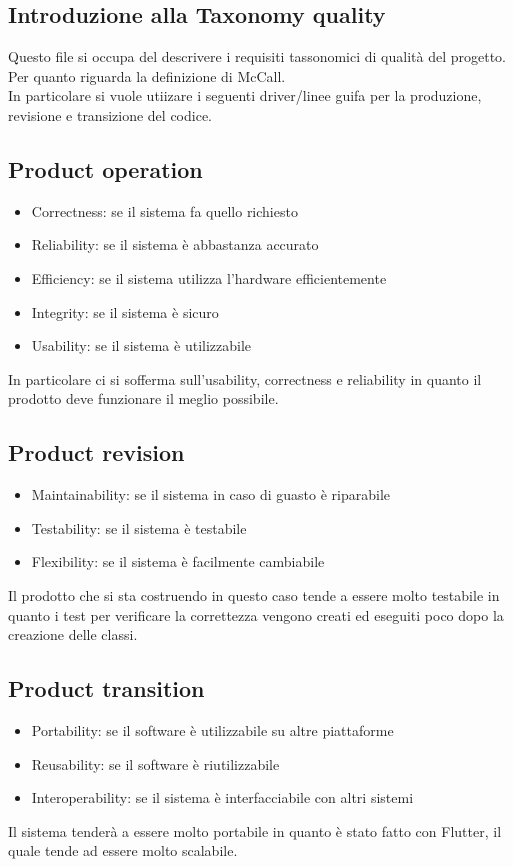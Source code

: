 \documentclass{article}
\begin{document}
\subsection{Introduzione alla Taxonomy quality}
Questo file si occupa del descrivere i requisiti tassonomici di qualità del progetto.
\\Per quanto riguarda la definizione di McCall.
\\In particolare si vuole utiizare i seguenti driver/linee guifa per la produzione, revisione e
transizione  del codice.     
\subsection{Product operation}
\begin{itemize}
    \item Correctness: se il sistema fa quello richiesto
    \item Reliability: se il sistema è abbastanza accurato
    \item Efficiency: se il sistema utilizza l'hardware efficientemente
    \item Integrity: se il sistema è sicuro
    \item Usability: se il sistema è utilizzabile
\end{itemize}
In particolare ci si sofferma sull'usability, correctness e reliability in quanto il 
prodotto deve funzionare il meglio possibile.

\subsection{Product revision}
\begin{itemize}
    \item Maintainability: se il sistema in caso di guasto è riparabile
    \item Testability: se il sistema è testabile 
    \item Flexibility: se il sistema è facilmente cambiabile
\end{itemize}
Il prodotto che si sta costruendo in questo caso tende a essere molto testabile in 
quanto i test per verificare la correttezza vengono creati ed eseguiti poco dopo la  creazione
delle classi.

\subsection{Product transition}
\begin{itemize}
    \item Portability: se il software è utilizzabile su altre piattaforme
    \item Reusability: se il software è riutilizzabile
    \item Interoperability: se il sistema è interfacciabile con altri sistemi
\end{itemize}
Il sistema tenderà a essere molto portabile in quanto è stato fatto con Flutter, il quale
tende ad essere molto scalabile.
\end{document}
